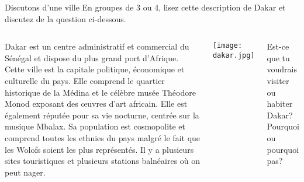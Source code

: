 \begin{frame}{Discutons d'une ville}
  En groupes de 3 ou 4, lisez cette description de Dakar et discutez de la question ci-dessous.
  \vspace{0.25cm}
  \begin{columns}
    \small
      Dakar est un centre administratif et commercial du Sénégal et dispose du plus grand port d'Afrique.
      Cette ville est la capitale politique, économique et culturelle du pays.
      Elle comprend le quartier historique de la Médina et le célèbre musée Théodore Monod exposant des œuvres d'art africain.
      Elle est également réputée pour sa vie nocturne, centrée sur la musique Mbalax.
      Sa population est cosmopolite et comprend toutes les ethnies du pays malgré le fait que les Wolofs soient les plus représentés.
      Il y a plusieurs sites touristiques et plusieurs stations balnéaires où on peut nager.
      \begin{center}
        \texttt{[image: dakar.jpg]}
      \end{center}
      Est-ce que tu voudrais visiter ou habiter Dakar?
      Pourquoi ou pourquoi pas?
  \end{columns}
\end{frame}